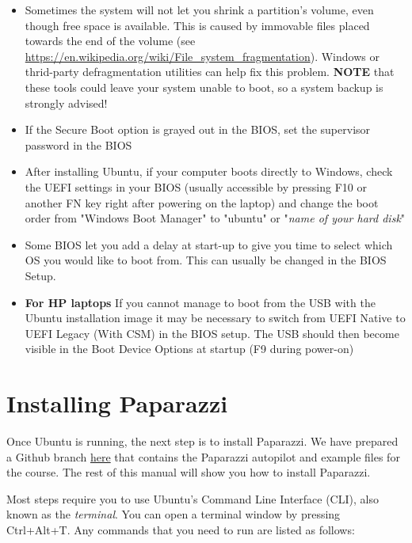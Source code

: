 \begin{itemize}
  \item Sometimes the system will not let you shrink a partition's volume, even though free space is available. This is caused by immovable files placed towards the end of the volume (see \url{https://en.wikipedia.org/wiki/File\_system\_fragmentation}). Windows or thrid-party defragmentation utilities can help fix this problem. \textbf{NOTE} that these tools could leave your system unable to boot, so a system backup is strongly advised!
  
  \item If the Secure Boot option is grayed out in the BIOS, set the supervisor password in the BIOS
  
  \item After installing Ubuntu, if your computer boots directly to Windows, check the UEFI settings in your BIOS (usually accessible by pressing F10 or another FN key right after powering on the laptop) and change the boot order from "Windows Boot Manager" to "ubuntu" or "\textit{name of your hard disk}"
  
  \item Some BIOS let you add a delay at start-up to give you time to select which OS you would like to boot from. This can usually be changed in the BIOS Setup.
  
  \item \textbf{For HP laptops} If you cannot manage to boot from the USB with the Ubuntu installation image it may be necessary to switch from UEFI Native to UEFI Legacy (With CSM) in the BIOS setup. The USB should then become visible in the Boot Device Options at startup (F9 during power-on)
\end{itemize}


\section{Installing Paparazzi}\label{sec:install}
Once Ubuntu is running, the next step is to install Paparazzi.
We have prepared a Github branch \href{https://github.com/tudelft/paparazzi/tree/mavlabCourse2019}{here} that contains the Paparazzi autopilot and example files for the course. The rest of this manual will show you how to install Paparazzi.

Most steps require you to use Ubuntu's Command Line Interface (CLI), also known as the \emph{terminal}. You can open a terminal window by pressing Ctrl+Alt+T. Any commands that you need to run are listed as follows:


